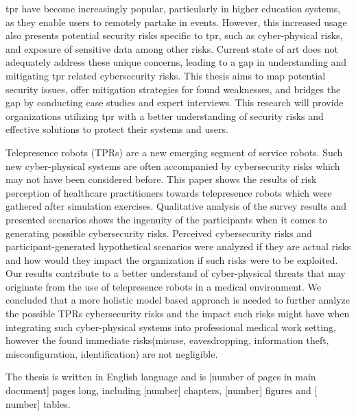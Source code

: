 \ac{tpr} have become increasingly popular, particularly
in higher education systems, as they enable users to remotely partake in
events. However, this increased usage also presents potential security risks
specific to \ac{tpr}, such as cyber-physical risks, and exposure of sensitive data among other risks.
Current state of art does not adequately
address these unique concerns, leading to a gap in understanding and
mitigating \ac{tpr} related cybersecurity risks.
This thesis aims to map potential security issues,
offer mitigation strategies for found weaknesses, and bridges the gap by
conducting case
studies and expert interviews.
This research will provide organizations utilizing \ac{tpr} with a
better understanding of security risks and effective solutions to protect
their systems and users.

Telepresence robots (TPRs) are a new emerging segment of service robots.
Such new cyber-physical systems are often accompanied by cybersecurity risks which may not have been considered before.
This paper shows the results of risk perception of healthcare practitioners towards telepresence robots
which were gathered after simulation exercises.
Qualitative analysis of the survey results and presented scenarios shows the ingenuity of the participants when it comes to
generating possible cybersecurity risks.
Perceived cybersecurity risks and participant-generated hypothetical scenarios were analyzed if they are actual risks and how would they
impact the organization if such risks were to be exploited.
Our results contribute to a better understand of cyber-physical threats that may originate from the use of telepresence robots in a
medical environment.
We concluded that a more holistic model based approach is needed to further analyze the possible TPRs cybersecurity risks and the
impact such risks might have when integrating such cyber-physical systems into professional medical work setting, however the found
immediate risks(misuse, eavesdropping, information theft, misconfiguration, identification) are not negligible.

The thesis is written in English language and is [number of pages in main document] pages long, including [number] chapters, [number]
figures and [
number] tables.
